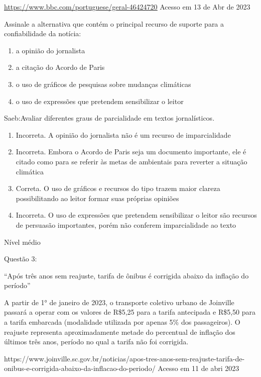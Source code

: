 \href{https://www.bbc.com/portuguese/geral-46424720}{\uline{https://www.bbc.com/portuguese/geral-46424720}}
Acesso em 13 de Abr de 2023

Assinale a alternativa que contém o principal recurso de suporte para a
confiabilidade da notícia:

\begin{enumerate}
\def\labelenumi{\alph{enumi})}
\item
  a opinião do jornalista
\item
  a citação do Acordo de Paris
\item
  o uso de gráficos de pesquisas sobre mudanças climáticas
\item
  o uso de expressões que pretendem sensibilizar o leitor
\end{enumerate}

Saeb:Avaliar diferentes graus de parcialidade em textos jornalísticos.

\begin{enumerate}
\def\labelenumi{\arabic{enumi}.}
\item
  Incorreta. A opinião do jornalista não é um recurso de imparcialidade
\item
  Incorreta. Embora o Acordo de Paris seja um documento importante, ele
  é citado como para se referir às metas de ambientais para reverter a
  situação climática
\item
  Correta. O uso de gráficos e recursos do tipo trazem maior clareza
  possibilitando ao leitor formar suas próprias opiniões
\item
  Incorreta. O uso de expressões que pretendem sensibilizar o leitor são
  recursos de persuasão importantes, porém não conferem imparcialidade
  ao texto
\end{enumerate}

Nível médio

Questão 3:

``Após três anos sem reajuste, tarifa de ônibus é corrigida abaixo da
inflação do período''

A partir de 1° de janeiro de 2023, o transporte coletivo urbano de
Joinville passará a operar com os valores de R\$5,25 para a tarifa
antecipada e R\$5,50 para a tarifa embarcada (modalidade utilizada por
apenas 5\% dos passageiros). O reajuste representa aproximadamente
metade do percentual de inflação dos últimos três anos, período no qual
a tarifa não foi corrigida.

https://www.joinville.sc.gov.br/noticias/apos-tres-anos-sem-reajuste-tarifa-de-onibus-e-corrigida-abaixo-da-inflacao-do-periodo/
Acesso em 11 de abri 2023

